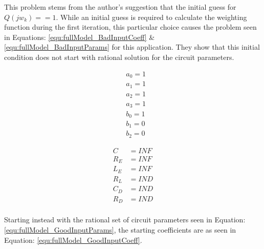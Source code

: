 This problem stems from the author's \cite{levy_iter} suggestion that the initial guess for $Q(jw_k) == 1$. While an initial guess is required to calculate the weighting function during the first iteration, this particular choice causes the problem seen in Equations: \eqref{equ:fullModel_BadInputCoeff} \& \eqref{equ:fullModel_BadInputParams} for this application. They show that this initial condition does not start with rational solution for the circuit parameters.

\begin{multicols}{2}
    \mbox{}\vfill
    \begin{equation}
        \label{equ:fullModel_BadInputCoeff}
        \begin{split}
            &a_0 = 1 \\
            &a_1 = 1 \\
            &a_2 = 1 \\
            &a_3 = 1 \\
            &b_0 = 1 \\
            &b_1 = 0 \\
            &b_2 = 0
        \end{split}
    \end{equation}

    \mbox{}\vfill
    \columnbreak

    \mbox{}\vfill
    \begin{equation}
        \label{equ:fullModel_BadInputParams}
        \begin{split}
             C   &= INF \\
             R_E &= INF \\
             L_E &= INF \\
             R_L &= IND \\
             C_D &= IND \\
             R_D &= IND \\
        \end{split}
    \end{equation}
    \mbox{}\vfill
\end{multicols}

Starting instead with the rational set of circuit parameters seen in Equation: \eqref{equ:fullModel_GoodInputParams}, the starting coefficients are as seen in Equation: \eqref{equ:fullModel_GoodInputCoeff}.

